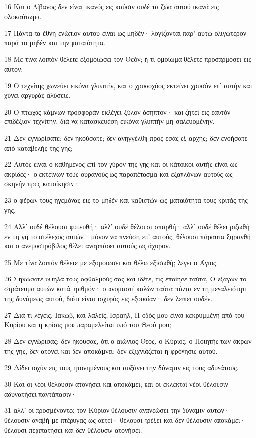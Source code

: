 \par 16 Και ο Λίβανος δεν είναι ικανός εις καύσιν ουδέ τα ζώα αυτού ικανά εις ολοκαύτωμα.
\par 17 Πάντα τα έθνη ενώπιον αυτού είναι ως μηδέν· λογίζονται παρ' αυτώ ολιγώτερον παρά το μηδέν και την ματαιότητα.
\par 18 Με τίνα λοιπόν θέλετε εξομοιώσει τον Θεόν; ή τι ομοίωμα θέλετε προσαρμόσει εις αυτόν;
\par 19 Ο τεχνίτης χωνεύει εικόνα γλυπτήν, και ο χρυσοχόος εκτείνει χρυσόν επ' αυτήν και χύνει αργυράς αλύσεις.
\par 20 Ο πτωχός κάμνων προσφοράν εκλέγει ξύλον άσηπτον· και ζητεί εις εαυτόν επιδέξιον τεχνίτην, διά να κατασκευάση εικόνα γλυπτήν μη σαλευομένην.
\par 21 Δεν εγνωρίσατε; δεν ηκούσατε; δεν ανηγγέλθη προς εσάς εξ αρχής; δεν ενοήσατε από καταβολής της γης;
\par 22 Αυτός είναι ο καθήμενος επί τον γύρον της γης και οι κάτοικοι αυτής είναι ως ακρίδες· ο εκτείνων τους ουρανούς ως παραπέτασμα και εξαπλόνων αυτούς ως σκηνήν προς κατοίκησιν·
\par 23 ο φέρων τους ηγεμόνας εις το μηδέν και καθιστών ως ματαιότητα τους κριτάς της γης.
\par 24 Αλλ' ουδέ θέλουσι φυτευθή· αλλ' ουδέ θέλουσι σπαρθή· αλλ' ουδέ θέλει ριζωθή εν τη γη το στέλεχος αυτών· μόνον να πνεύση επ' αυτούς, θέλουσι πάραυτα ξηρανθή και ο ανεμοστρόβιλος θέλει αναρπάσει αυτούς ως άχυρον.
\par 25 Με τίνα λοιπόν θέλετε με εξομοιώσει και θέλω εξισωθή; λέγει ο Άγιος.
\par 26 Σηκώσατε υψηλά τους οφθαλμούς σας και ιδέτε, τις εποίησε ταύτα; Ο εξάγων το στράτευμα αυτών κατά αριθμόν· ο ονομαστί καλών ταύτα πάντα εν τη μεγαλειότητι της δυνάμεως αυτού, διότι είναι ισχυρός εις εξουσίαν· δεν λείπει ουδέν.
\par 27 Διά τι λέγεις, Ιακώβ, και λαλείς, Ισραήλ, Η οδός μου είναι κεκρυμμένη από του Κυρίου και η κρίσις μου παραμελείται υπό του Θεού μου;
\par 28 Δεν εγνώρισας; δεν ήκουσας, ότι ο αιώνιος Θεός, ο Κύριος, ο Ποιητής των άκρων της γης, δεν ατονεί και δεν αποκάμνει; δεν εξιχνιάζεται η φρόνησις αυτού.
\par 29 Δίδει ισχύν εις τους ητονημένους και αυξάνει την δύναμιν εις τους αδυνάτους.
\par 30 Και οι νέοι θέλουσιν ατονήσει και αποκάμει, και οι εκλεκτοί νέοι θέλουσιν αδυνατήσει παντάπασιν·
\par 31 αλλ' οι προσμένοντες τον Κύριον θέλουσιν ανανεώσει την δύναμιν αυτών· θέλουσιν αναβή με πτέρυγας ως αετοί· θέλουσι τρέξει και δεν θέλουσιν αποκάμει· θέλουσι περιπατήσει και δεν θέλουσιν ατονήσει.


